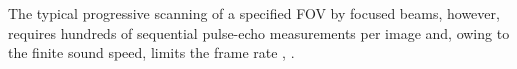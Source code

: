 The typical progressive scanning of
a specified \ac{FOV} by
focused beams, however, requires
hundreds of
sequential pulse-echo measurements per
image and, owing to
the finite sound speed, limits
the frame rate
\cite[536--539]{book:Bushberg2011},
\cite{article:JensenProgBMB2007,article:WellsPMB2006}.
